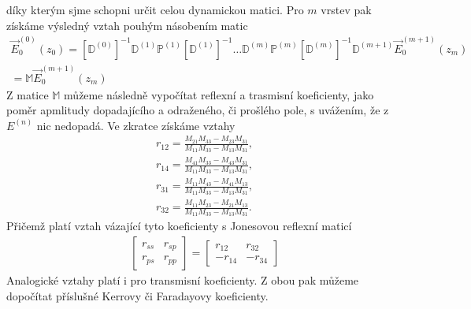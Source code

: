 díky kterým sjme schopni určit celou dynamickou matici.
Pro $m$ vrstev pak získáme výsledný vztah pouhým násobením matic
\begin{eqnarray}
\vec{E}_0^{(0)}(z_0) = [\mathbb{D}^{(0)}]^{-1}\mathbb{D}^{(1)}\mathbb{P}^{(1)}[\mathbb{D}^{(1)}]^{-1}\dots \mathbb{D}^{(m)}\mathbb{P}^{(m)}[\mathbb{D}^{(m)}]^{-1}\mathbb{D}^{(m+1)}\vec{E}_0^{(m+1)}(z_m)\\
=\mathbb{M}\vec{E}_0^{(m+1)}(z_m)
\end{eqnarray}
Z matice $\mathbb{M}$ můžeme následně vypočítat reflexní a trasmisní koeficienty, jako poměr apmlitudy dopadajícího a odraženého, či prošlého pole, s uvážením, že z $E^{(n)}$ nic nedopadá. Ve zkratce získáme vztahy %
\begin{eqnarray}
r_{12}=\frac{M_{21}M_{33} - M_{23}M_{31}}{M_{11}M_{33}-M_{13}M_{31}}, \\
r_{14}=\frac{M_{41}M_{33}-M_{43}M_{31}}{M_{11}M_{33}-M_{13}M_{31}}, \\
r_{31}=\frac{M_{11}M_{43}-M_{41}M_{13}}{M_{11}M_{33}-M_{13}M_{31}}, \\
r_{32}=\frac{M_{11}M_{23}-M_{21}M_{13}}{M_{11}M_{33}-M_{13}M_{31}}.
\end{eqnarray}
Přičemž platí vztah vázající tyto koeficienty s Jonesovou reflexní maticí
\begin{eqnarray}
\begin{bmatrix}
r_{ss} & r_{sp} \\ r_{ps} & r_{pp} 
\end{bmatrix}
= 
\begin{bmatrix} 
r_{12} &r_{32} \\ -r_{14} & -r_{34} 
\end{bmatrix}
\end{eqnarray}
Analogické vztahy platí i pro transmisní koeficienty. Z obou pak můžeme dopočítat příslušné Kerrovy či Faradayovy koeficienty.

